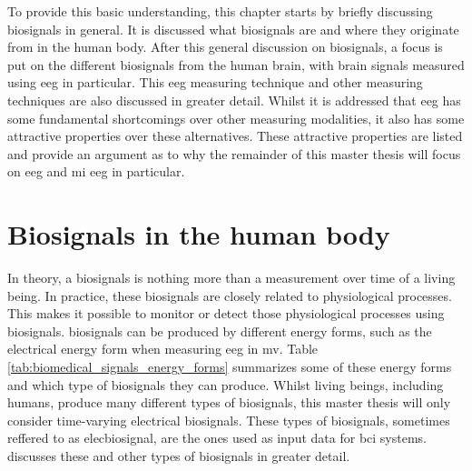 To provide this basic understanding, this chapter starts by briefly discussing \glspl{biosignal} in general.
It is discussed what \glspl{biosignal} are and where they originate from in the human body.
After this general discussion on \glspl{biosignal}, a focus is put on the different \glspl{biosignal} from the human brain, with brain signals measured using \gls{eeg} in particular.
This \gls{eeg} measuring technique and other measuring techniques are also discussed in greater detail.
Whilst it is addressed that \gls{eeg} has some fundamental shortcomings over other measuring modalities, it also has some attractive properties over these alternatives.
These attractive properties are listed and provide an argument as to why the remainder of this master thesis will focus on \gls{eeg} and \gls{mi} \gls{eeg} in particular.


\section{Biosignals in the human body}
\label{sec:biomedical_signals_biosignals_in_human}

In theory, a \glspl{biosignal} is nothing more than a measurement over time of a living
being.
In practice, these \glspl{biosignal} are closely related to physiological processes.
This makes it possible to monitor or detect those physiological processes using \glspl{biosignal}.
\Glspl{biosignal} can be produced by different energy forms, such as the electrical energy form when measuring \gls{eeg} in \gls{mv}.
Table \ref{tab:biomedical_signals_energy_forms} summarizes some of these energy forms and which type of \glspl{biosignal} they can produce.
Whilst living beings, including humans, produce many different types of \glspl{biosignal}, this master thesis will only consider time-varying electrical \glspl{biosignal}.
These types of \glspl{biosignal}, sometimes reffered to as \gls{elecbiosignal}, are the ones used as input data for \gls{bci} systems.
 discusses these and other types of \glspl{biosignal} in greater detail.

